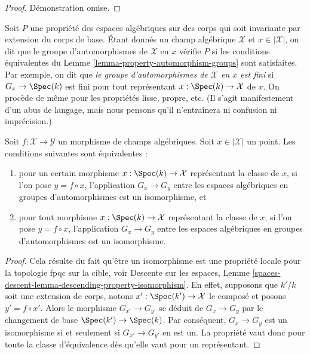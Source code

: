 \begin{proof}
Démonstration omise.
\end{proof}

\begin{remark}
\label{remark-property-automorphism-groups}
Soit $P$ une propriété des espaces algébriques sur des corps qui soit
invariante par extension du corps de base. Étant donnés un champ algébrique
$\mathcal{X}$ et $x \in |\mathcal{X}|$, on dit que le groupe d'automorphismes
de $\mathcal{X}$ en $x$ vérifie $P$ si les conditions équivalentes du
Lemme \ref{lemma-property-automorphism-groups} sont satisfaites.
Par exemple, on dit que {\it le groupe d'automorphismes de $\mathcal{X}$
en $x$ est fini} si $G_x \to \Spec(k)$ est fini pour tout représentant
$x : \Spec(k) \to \mathcal{X}$ de $x$.
On procède de même pour les propriétés lisse, propre, etc.
(Il s'agit manifestement d'un abus de langage, mais nous pensons qu'il
n'entraînera ni confusion ni imprécision.)
\end{remark}

\begin{lemma}
\label{lemma-iso-automorphism-groups}
Soit $f : \mathcal{X} \to \mathcal{Y}$ un morphisme de champs algébriques.
Soit $x \in |\mathcal{X}|$ un point. Les conditions suivantes sont équivalentes :
\begin{enumerate}
\item pour un certain morphisme $x : \Spec(k) \to \mathcal{X}$ représentant
la classe de $x$, si l'on pose $y = f \circ x$, l'application
$G_x \to G_y$ entre les espaces algébriques en groupes d'automorphismes est
un isomorphisme, et
\item pour tout morphisme $x : \Spec(k) \to \mathcal{X}$ représentant
la classe de $x$, si l'on pose $y = f \circ x$, l'application
$G_x \to G_y$ entre les espaces algébriques en groupes d'automorphismes est
un isomorphisme.
\end{enumerate}
\end{lemma}

\begin{proof}
Cela résulte du fait qu'être un isomorphisme est une propriété locale pour la
topologie fpqc sur la cible, voir Descente sur les espaces, Lemme
\ref{spaces-descent-lemma-descending-property-isomorphism}.
En effet, supposons que $k'/k$ soit une extension de corps, notons
$x' : \Spec(k') \to \mathcal{X}$ le composé et posons $y' = f \circ x'$.
Alors le morphisme $G_{x'} \to G_{y'}$ se déduit de $G_x \to G_y$ par le
changement de base $\Spec(k') \to \Spec(k)$.
Par conséquent, $G_x \to G_y$ est un isomorphisme si et seulement si
$G_{x'} \to G_{y'}$ en est un. La propriété vaut donc pour toute la classe
d'équivalence dès qu'elle vaut pour un représentant.
\end{proof}

